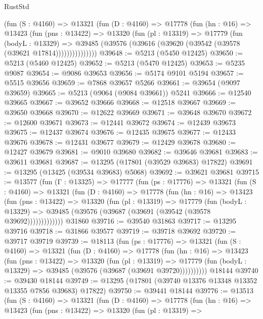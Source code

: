 \begin{lexlean}{RustStd}
\begin{coremodule}
          (fun (S : @4160) =>
          @13321
            (fun (D : @4160) =>
            @17778
              (fun (hn : @16) =>
              @13423
                (fun (pns : @13422) =>
                @13320
                  (fun (pl : @13319) =>
                  @17779
                    (fun (bodyL : @13329) =>
                    @39485 (@39576 (@39616 (@39620 (@39542 (@39578 (@39621 @17814)))))))))))))))
@39648 := @5213 (@5450 @12425)
@39650 := @5213 (@5460 @12425)
@39652 := @5213 (@5470 @12425)
@39653 := @5235 @9087
@39654 := @9086 @39653
@39656 := @5174 @9101 @5194
@39657 := @5515 @39656
@39659 := @7868 @39657 @5266
@39661 := @39654 (@9097 @39659)
@39665 := @5213 (@9064 (@9084 @39661)) @5241
@39666 := @12540 @39665
@39667 := @39652 @39666
@39668 := @12518 @39667
@39669 := @39650 @39668
@39670 := @12622 @39669
@39671 := @39648 @39670
@39672 := @12600 @39671
@39673 := @12441 @39672
@39674 := @12439 @39673
@39675 := @12437 @39674
@39676 := @12435 @39675
@39677 := @12433 @39676
@39678 := @12431 @39677
@39679 := @12429 @39678
@39680 := @12427 @39679
@39681 := @9010 @39680
@39682 := @39646 @39681
@39683 := @39611 @39681
@39687 := @13295 (@17801 (@39529 @39683) @17822)
@39691 := @13295 (@13425 (@39534 @39683) @5068)
@39692 := @39621 @39681
@39715 := @13577
    (fun (Γ : @13325) =>
    @17777
      (fun (ps : @17776) =>
      @13321
        (fun (S : @4160) =>
        @13321
          (fun (D : @4160) =>
          @17778
            (fun (hn : @16) =>
            @13423
              (fun (pns : @13422) =>
              @13320
                (fun (pl : @13319) =>
                @17779
                  (fun (bodyL : @13329) =>
                  @39485 (@39576 (@39687 (@39691 (@39542 (@39578 @39692)))))))))))))
    @31860
@39716 := @39540 @31863
@39717 := @13295 @39716
@39718 := @31866 @39577
@39719 := @39718 @39692
@39720 := @39717 @39719
@39739 := @18113
    (fun (ps : @17776) =>
    @13321
      (fun (S : @4160) =>
      @13321
        (fun (D : @4160) =>
        @17778
          (fun (hn : @16) =>
          @13423
            (fun (pns : @13422) =>
            @13320
              (fun (pl : @13319) =>
              @17779 (fun (bodyL : @13329) => @39485 (@39576 (@39687 (@39691 @39720))))))))))
    @18144
@39740 := @39430 @18144
@39749 := @13295 (@17801 (@39740 @13376 @13348 @13352 @13355 @7856 @39683) @17822)
@39750 := @39441 @18144
@39776 := @13513
    (fun (S : @4160) =>
    @13321
      (fun (D : @4160) =>
      @17778
        (fun (hn : @16) =>
        @13423
          (fun (pns : @13422) =>
          @13320
            (fun (pl : @13319) =>

\end{coremodule}
\end{lexlean}
